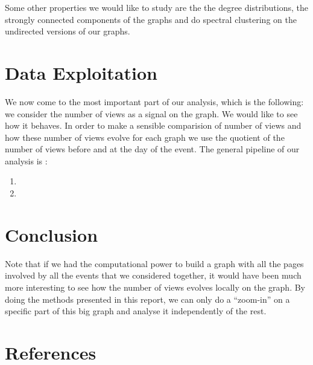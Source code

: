 \documentclass{article}
\begin{document}
Some other properties we would like to  study are the the degree distributions, the strongly connected components of the graphs and do spectral clustering on the undirected versions of our graphs. 
\section{Data Exploitation}

We now come to the most important part of our analysis, which is the following: we consider the number of views as a signal on the graph. We would like to see how it behaves. In order to make a sensible comparision of number of views and how these number of views evolve for each graph we use the quotient of the number of views before and at the day of the event. 
The general pipeline of our analysis is :  
\begin{enumerate}
\item 
\item 
\end{enumerate}

\section{Conclusion}

Note that if we had the computational power to build a graph with all the pages involved by all the events that we considered together, it would have been much more interesting to see how the number of views evolves locally on the graph. By doing the methods presented in this report, we can only do a “zoom-in” on a specific part of this big graph and analyse it independently of the rest. 


\section*{References}


\cite{laplacian}  
\cite{signalprocessing}
\cite{clustering}



\end{document}
